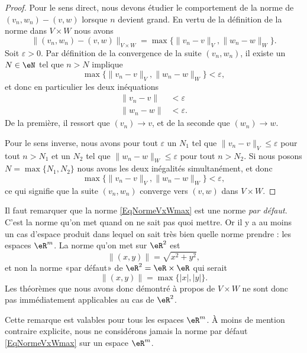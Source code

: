 \begin{proof}
	Pour le sens direct, nous devons étudier le comportement de la norme de $(v_n,w_n)-(v,w)$ lorsque $n$ devient grand. En vertu de la définition de la norme dans $V\times W$ nous avons
	\begin{equation}
		\Big\| (v_n,w_n)-(v,w) \Big\|_{V\times W}=\max\big\{ \| v_n-v \|_V,\| w_n-w \|_W \big\}.
	\end{equation}
	Soit $\varepsilon>0$. Par définition de la convergence de la suite $(v_n,w_n)$, il existe un $N\in\eN$ tel que $n>N$ implique
	\begin{equation}
		\max\big\{ \| v_n-v \|_V,\| w_n-w \|_W \big\}<\varepsilon,
	\end{equation}
	et donc en particulier les deux inéquations
	\begin{subequations}
		\begin{align}
			\| v_n-v \|&<\varepsilon\\
			\| w_n-w \|&<\varepsilon.
		\end{align}
	\end{subequations}
	De la première, il ressort que $(v_n)\to v$, et de la seconde que $(w_n)\to w$.

	Pour le sens inverse, nous avons pour tout $\varepsilon$ un $N_1$ tel que $\| v_n-v \|_V\leq\varepsilon$ pour tout $n>N_1$ et un $N_2$ tel que $\| w_n-w \|_W\leq\varepsilon$ pour tout $n>N_2$. Si nous posons $N=\max\{ N_1,N_2 \}$ nous avons les deux inégalités simultanément, et donc
	\begin{equation}
		\max\big\{ \| v_n-v \|_V,\| w_n-w \|_W \big\}<\varepsilon,
	\end{equation}
	ce qui signifie que la suite $(v_n,w_n)$ converge vers $(v,w)$ dans $V\times W$.
\end{proof}

\begin{remark}		\label{RemTopoProdPasRm}
	Il faut remarquer que la norme \eqref{EqNormeVxWmax} est une norme \emph{par défaut}. C'est la norme qu'on met quand on ne sait pas quoi mettre. Or il y a au moins un cas d'espace produit dans lequel on sait très bien quelle norme prendre : les espaces $\eR^m$. La norme qu'on met sur $\eR^2$ est
	\begin{equation}
		\| (x,y) \|=\sqrt{x^2+y^2},
	\end{equation}
	et non la norme «par défaut» de $\eR^2=\eR\times\eR$ qui serait
	\begin{equation}
		\| (x,y) \|=\max\{ | x |,| y | \}.
	\end{equation}
	Les théorèmes que nous avons donc démontré à propos de $V\times W$ ne sont donc pas immédiatement applicables au cas de $\eR^2$.

	Cette remarque est valables pour tous les espaces $\eR^m$. À moins de mention contraire explicite, nous ne considérons jamais la norme par défaut \eqref{EqNormeVxWmax} sur un espace $\eR^m$.
\end{remark}

